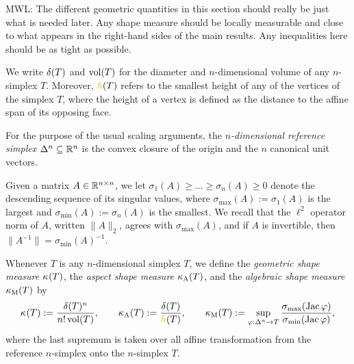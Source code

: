 \documentclass[10pt,letterpaper]{article}
\newcommand{\mwl}[1]{{\color{red}#1}}
\begin{document}
\mwl{MWL: The different geometric quantities in this section should really be just what is needed later. Any shape measure should be locally measurable and close to what appears in the right-hand sides of the main results. Any inequalities here should be as tight as possible. }

We write ${\delta}(T)$ and $\operatorname{vol}(T)$ for the diameter and $n$-dimensional volume of any $n$-simplex $T$.
Moreover, $\height(T)$ refers to the smallest height of any of the vertices of the simplex $T$,
where the height of a vertex is defined as the distance to the affine span of its opposing face.

For the purpose of the usual scaling arguments, the \emph{$n$-dimensional reference simplex} $\Delta^n \subseteq {\mathbb R}^n$ is the convex closure of the origin and the $n$ canonical unit vectors. 

Given a matrix $A \in {\mathbb R}^{n \times n}$, we let $\sigma_{1}(A) \geq \dots \geq \sigma_{n}(A) \geq 0$ denote the descending sequence of its singular values, 
where $\sigma_{\max}(A) := \sigma_{1}(A)$ is the largest and $\sigma_{\min}(A) := \sigma_{n}(A)$ is the smallest. 
We recall that the $\ell^{2}$ operator norm of $A$, written $\| A \|_{2}$, agrees with $\sigma_{\max}(A)$,
and if $A$ is invertible, then $\|A^{-1}\| = \sigma_{\min}(A)^{-1}$.

Whenever $T$ is any $n$-dimensional simplex $T$,
we define the \textit{geometric shape measure} $\kappa_{}(T)$,
the \textit{aspect shape measure} $\kappa_{\rm A}(T)$,
and 
the \textit{algebraic shape measure} $\kappa_{\rm M}(T)$
by 
\begin{align}\label{math:shapemeasure}
    \geometricshapemeasure(T)
    := 
    \frac{ \diam(T)^{n} }{ n! \vol(T) }
    ,
    \qquad 
    \aspectratio(T)
    := 
    \frac{ \diam(T) }{ \height(T) }
    ,
    \qquad 
    \algebraicshapemeasure(T)
    := 
    \sup_{ \varphi : \Delta^n \rightarrow T } 
    \frac{ \sigma_{\max}( \Jacobian \varphi ) }{ \sigma_{\min}( \Jacobian \varphi ) }
    ,
\end{align}
where the last supremum is taken over all affine transformation from the reference $n$-simplex onto the $n$-simplex $T$. 
\end{document}
